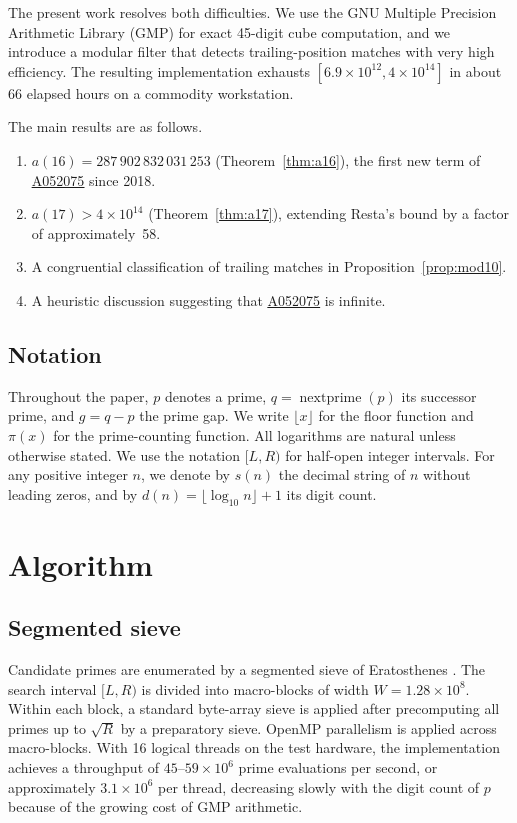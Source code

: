 \documentclass[12pt,reqno]{article}
\theoremstyle{plain}
\theoremstyle{definition}
\theoremstyle{remark}
\newcommand{\np}{\operatorname{nextprime}}
\newcommand{\seqnum}[1]{\href{https://oeis.org/#1}{\rm \underline{#1}}}
\begin{document}
The present work resolves both difficulties.
We use the GNU Multiple Precision Arithmetic Library
(GMP) \cite{GMP} for exact 45-digit cube computation, and we introduce
a modular filter that detects trailing-position matches with very high
efficiency.
The resulting implementation exhausts $[6.9 \times 10^{12},
4 \times 10^{14}]$ in about 66 elapsed hours on a commodity workstation.

The main results are as follows.
\begin{enumerate}
\item $a(16) = 287\,902\,832\,031\,253$ (Theorem~\ref{thm:a16}),
      the first new term of \seqnum{A052075} since 2018.
\item $a(17) > 4 \times 10^{14}$ (Theorem~\ref{thm:a17}),
      extending Resta's bound by a factor of approximately~58.
\item A congruential classification of trailing matches in
      Proposition~\ref{prop:mod10}.
\item A heuristic discussion suggesting that \seqnum{A052075} is infinite.
\end{enumerate}

\subsection{Notation}
\label{sec:notation}

Throughout the paper, $p$ denotes a prime, $q = \np(p)$ its successor
prime, and $g = q - p$ the prime gap.
We write $\lfloor x \rfloor$ for the floor function and $\pi(x)$ for
the prime-counting function.
All logarithms are natural unless otherwise stated.
We use the notation $[L, R)$ for half-open integer intervals.
For any positive integer $n$, we denote by $s(n)$ the decimal string
of $n$ without leading zeros, and by
$d(n) = \lfloor \log_{10} n \rfloor + 1$ its digit count.

\section{Algorithm}
\label{sec:algorithm}

\subsection{Segmented sieve}
\label{sec:sieve}

Candidate primes are enumerated by a segmented sieve of
Eratosthenes \cite{Sorenson1991}.
The search interval $[L, R)$ is divided into macro-blocks of width
$W = 1.28 \times 10^{8}$.
Within each block, a standard byte-array sieve is applied after
precomputing all primes up to $\sqrt{R}$ by a preparatory sieve.
OpenMP \cite{OpenMP} parallelism is applied across macro-blocks.
With 16 logical threads on the test hardware, the implementation
achieves a throughput of $45$--$59 \times 10^6$ prime evaluations
per second, or approximately $3.1 \times 10^6$ per thread, decreasing
slowly with the digit count of $p$ because of the growing cost of
GMP arithmetic.
\end{document}
